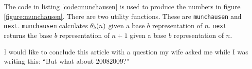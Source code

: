 The code in listing \ref{code:munchausen} is used to produce the numbers in
figure \ref{figure:munchausen}. There are two utility functions. These are 
\lstinline!munchausen! and \lstinline!next!. \lstinline!munchausen! calculates 
$\P_{b}(n)$ given a base $b$ representation of $n$. \lstinline!next! returns the
base $b$ representation of $n+1$ given a base $b$ representation of $n$.

I would like to conclude this article with a question my wife asked me while I
was writing this: ``But what about $20082009$?''



